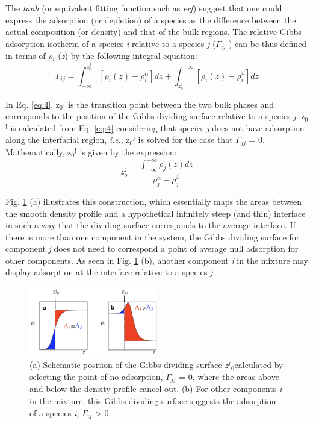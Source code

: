 \documentclass[9pt,bestpractices]{livecoms}
\begin{document}
The \textit{tanh} (or equivalent fitting function such as \textit{erf}) suggest
that one could express the adsorption (or depletion) of a species as the
difference between the actual composition (or density) and that of the bulk
regions. The relative Gibbs adsorption isotherm of a species \textit{i}
relative to a species \textit{j} (${\Gamma}$$_{ij}$ ) can be thus defined in
terms of ${\rho}$$_{i}$ (\textit{z}) by the following integral
equation\citep{evans1992}:
\begin{equation}
\varGamma_{ij}=\int_{-\infty}^{z_{0}^{j}}\left[\rho_{i}\left(z\right)-\rho{}_{i}^{\alpha}\right]dz+\int_{z_{0}^{j}}^{+\infty}\left[\rho_{i}\left(z\right)-\rho{}_{i}^{\beta}\right]dz
 \label{eq:4}
\end{equation}

In Eq. \ref{eq:4}, z$_{0}$$^{\mathrm{j}}$ is the transition point between the two bulk
phases and corresponds to the position of the Gibbs dividing surface relative
to a species \textit{j}. z$_{0}$$^{\mathrm{j}}$ is calculated from Eq. \ref{eq:4}
considering that species \textit{j} does not have adsorption along the
interfacial region, \textit{i.e}., z$_{0}$$^{\mathrm{j}}$ is solved for the
case that ${\Gamma}$$_{jj}$ = 0. Mathematically, z$_{0}$$^{\mathrm{j}}$ is
given by the expression:
\begin{equation}
z_{o}^{j}=\frac{\int_{-\infty}^{+\infty}\rho_{j}\left(z\right)dz}{\rho_{j}^{\alpha}-\rho_{j}^{\beta}}
\end{equation}

Fig. \ref{fig:4} (a) illustrates this construction, which essentially maps the areas
between the smooth density profile and a hypothetical infinitely steep (and
thin) interface in such a way that the dividing surface corresponds to the
average interface. If there is more than one component in the system, the
Gibbs dividing surface for component \textit{j} does not need to correspond
a point of average null adsorption for other components. As seen in Fig. \ref{fig:4} (b),
another component \textit{i} in the mixture may display adsorption at the
interface relative to a species \textit{j.}

\begin{figure}
\includegraphics[width=0.5\textwidth]{gfx/image11.png}
\caption{(a) Schematic position of the Gibbs dividing surface \textit{z}$^{j}$$_{0 }$calculated by selecting the point of no adsorption, ${\Gamma}$$_{jj}$ = 0, where the areas above and below the density profile cancel out. (b) For other components \textit{i}  in the mixture, this Gibbs dividing surface suggests the adsorption of a species \textit{i,} ${\Gamma}$$_{ij}$ {\textgreater} 0.}
\label{fig:4}
\end{figure}
\end{document}
